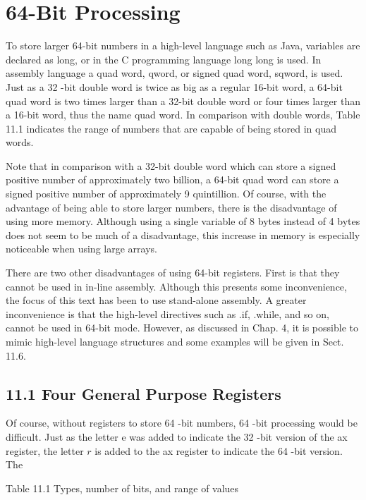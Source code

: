 \documentclass[10pt]{article}
\begin{document}
\section*{64-Bit Processing}
To store larger 64-bit numbers in a high-level language such as Java, variables are declared as long, or in the C programming language long long is used. In assembly language a quad word, qword, or signed quad word, sqword, is used. Just as a 32 -bit double word is twice as big as a regular 16-bit word, a 64-bit quad word is two times larger than a 32-bit double word or four times larger than a 16-bit word, thus the name quad word. In comparison with double words, Table 11.1 indicates the range of numbers that are capable of being stored in quad words.

Note that in comparison with a 32-bit double word which can store a signed positive number of approximately two billion, a 64-bit quad word can store a signed positive number of approximately 9 quintillion. Of course, with the advantage of being able to store larger numbers, there is the disadvantage of using more memory. Although using a single variable of 8 bytes instead of 4 bytes does not seem to be much of a disadvantage, this increase in memory is especially noticeable when using large arrays.

There are two other disadvantages of using 64-bit registers. First is that they cannot be used in in-line assembly. Although this presents some inconvenience, the focus of this text has been to use stand-alone assembly. A greater inconvenience is that the high-level directives such as .if, .while, and so on, cannot be used in 64-bit mode. However, as discussed in Chap. 4, it is possible to mimic high-level language structures and some examples will be given in Sect. 11.6.

\subsection*{11.1 Four General Purpose Registers}
Of course, without registers to store 64 -bit numbers, 64 -bit processing would be difficult. Just as the letter e was added to indicate the 32 -bit version of the ax register, the letter $r$ is added to the ax register to indicate the 64 -bit version. The

Table 11.1 Types, number of bits, and range of values
\end{document}
